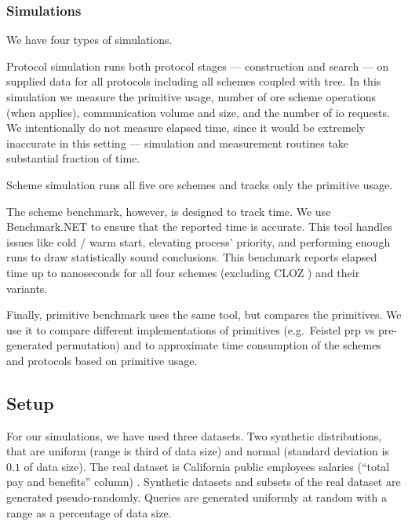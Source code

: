 		\subsubsection{Simulations}

			

			We have four types of simulations.

			Protocol simulation runs both protocol stages --- construction and search --- on supplied data for all protocols including all schemes coupled with {\BPlus} tree.
			In this simulation we measure the primitive usage, number of \acrshort{ore} scheme operations (when applies), communication volume and size, and the number of \acrshort{io} requests.
			We intentionally do not measure elapsed time, since it would be extremely inaccurate in this setting --- simulation and measurement routines take substantial fraction of time.

			Scheme simulation runs all five \acrshort{ore} schemes and tracks only the primitive usage.

			The scheme benchmark, however, is designed to track time.
			We use Benchmark.NET \cite{benchmark-net} to ensure that the reported time is accurate.
			This tool handles issues like cold / warm start, elevating process' priority, and performing enough runs to draw statistically sound conclusions.
			This benchmark reports elapsed time up to nanoseconds for all four schemes (excluding CLOZ \cite{parameter-hiding-ore}) and their variants.

			Finally, primitive benchmark uses the same tool, but compares the primitives.
			We use it to compare different implementations of primitives (e.g.\ Feistel \acrshort{prp} vs pre-generated permutation) and to approximate time consumption of the schemes and protocols based on primitive usage.

	\subsection{Setup}

		For our simulations, we have used three datasets.
		Two synthetic distributions, that are uniform (range is third of data size) and normal (standard deviation is $0.1$ of data size).
		The real dataset is California public employees salaries (``total pay and benefits'' column) \cite{ca-dataset}.
		Synthetic datasets and subsets of the real dataset are generated pseudo\hyp{}randomly.
		Queries are generated uniformly at random with a range as a percentage of data size.

